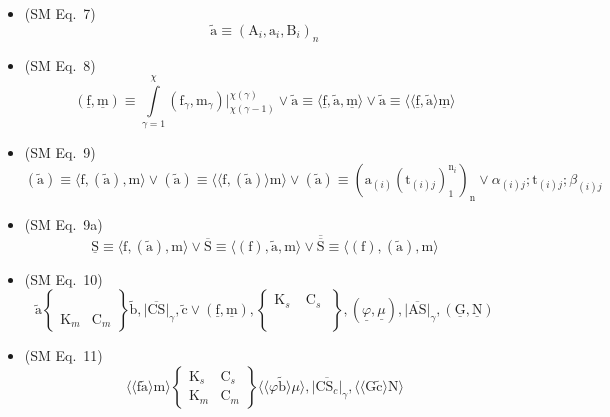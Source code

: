 \documentclass[12pt]{article}
\begin{document}
\begin{itemize}[label={},leftmargin=0pt]
    \item (SM Eq.\ 7) 
    \[
    \tilde{\mathrm{a}} \equiv (\mathrm{A}_i, \mathrm{a}_i, \mathrm{B}_i)_n
    \]

    \item (SM Eq.\ 8) 
    \[
    (\underline{\mathrm{f}}, \underline{\mathrm{m}}) \equiv \int\limits_{\gamma=1}^\chi (\mathrm{f}_\gamma, \mathrm{m}_\gamma) \big|_{\chi(\gamma-1)}^{\chi(\gamma)} \lor \tilde{\mathrm{a}} \equiv \langle \underline{\mathrm{f}}, \tilde{\mathrm{a}}, \underline{\mathrm{m}} \rangle \lor \tilde{\mathrm{a}} \equiv \langle\langle \underline{\mathrm{f}}, \tilde{\mathrm{a}} \rangle \underline{\mathrm{m}} \rangle
    \]

    \item (SM Eq.\ 9) 
    \[
    (\tilde{\mathrm{a}}) \equiv \langle \mathrm{f}, (\tilde{\mathrm{a}}), \mathrm{m} \rangle \lor (\tilde{\mathrm{a}}) \equiv \langle\langle \mathrm{f}, (\tilde{\mathrm{a}}) \rangle \mathrm{m} \rangle \lor (\tilde{\mathrm{a}}) \equiv \left( \mathrm{a}_{(i)}(\mathrm{t}_{(i)j})_1^{\mathrm{n}_i} \right)_\mathrm{n} \lor \alpha_{(i)j} ; \mathrm{t}_{(i)j} ; \beta_{(i)j}
    \]

    \item (SM Eq.\ 9a) 
    \[
    \underline{\mathrm{S}} \equiv \langle \mathrm{f}, (\tilde{\mathrm{a}}), \mathrm{m} \rangle \lor \overline{\mathrm{S}} \equiv \langle (\mathrm{f}), \tilde{\mathrm{a}}, \mathrm{m} \rangle \lor \overline{\overline{\mathrm{S}}} \equiv \langle (\mathrm{f}), (\tilde{\mathrm{a}}), \mathrm{m} \rangle
    \]

    \item (SM Eq.\ 10) 
    \[
    \tilde{\mathrm{a}} \left\{ \begin{smallmatrix} \phantom{\mathrm{K}_s} & \phantom{\mathrm{C}_s} \\ \mathrm{K}_m & \mathrm{C}_m \end{smallmatrix} \right\} \tilde{\mathrm{b}}, \overline{\lvert\mathrm{CS}\rvert}_\gamma, \tilde{\mathrm{c}} \lor (\underline{\mathrm{f}}, \underline{\mathrm{m}}), \left\{ \begin{smallmatrix} \mathrm{K}_s & \mathrm{C}_s \\ \phantom{\mathrm{K}_m} & \phantom{\mathrm{C}_m} \end{smallmatrix} \right\}, (\underline{\varphi}, \underline{\mu}), \overline{\lvert\mathrm{AS}\rvert}_\gamma, (\underline{\mathrm{G}}, \underline{\mathrm{N}})
    \]

    \item (SM Eq.\ 11) 
    \[
    \langle\langle \mathrm{f} \tilde{\mathrm{a}} \rangle \mathrm{m} \rangle \left\{ \begin{smallmatrix} \mathrm{K}_s & \mathrm{C}_s \\ \mathrm{K}_m & \mathrm{C}_m \end{smallmatrix} \right\} \langle\langle \varphi \tilde{\mathrm{b}} \rangle \mu \rangle, \overline{|\mathrm{CS}_c|}_\gamma, \langle\langle \mathrm{G} \tilde{\mathrm{c}} \rangle \mathrm{N} \rangle
    \]


\end{itemize}
\end{document}
